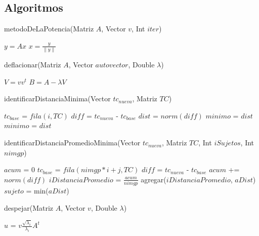 \subsection{Algoritmos}

\begin{algorithm}
\caption{metodoDeLaPotencia(Matriz $A$, Vector $v$, Int $iter$)}
\label{pseudo:metodoDeLaPotencia}
\begin{algorithmic}
    \STATE $y = Ax$
    \STATE $x = \frac{y}{\parallel y \parallel}$
  \ENDFOR
\end{algorithmic}
\end{algorithm}
\begin{algorithm}
\caption{deflacionar(Matriz $A$, Vector $autovector$, Double $\lambda$)}
\label{pseudo:deflacionar}
\begin{algorithmic}
  \STATE $V = vv^t$
  \STATE $B = A - \lambda V$
\end{algorithmic}
\end{algorithm}
\begin{algorithm}
\caption{identificarDistanciaMinima(Vector $tc_{nueva}$, Matriz $TC$)}
\label{pseudo:identificarDistanciMinima}
\begin{algorithmic}
    \STATE $tc_{base}$ = $fila(i, TC)$
    \STATE $diff$ = $tc_{nueva}$ - $tc_{base}$
    \STATE $dist$ = $norm(diff)$
      \STATE $minimo$ = $dist$
    \ENDIF
      \STATE $minimo$ = $dist$
    \ENDIF    
  \ENDFOR
\end{algorithmic}
\end{algorithm}
\begin{algorithm}
\caption{identificarDistanciaPromedioMinima(Vector $tc_{nueva}$, Matriz $TC$, Int $iSujetos$, Int $nimgp$)}
\label{pseudo:identificarDistanciaPromedioMinima}
\begin{algorithmic}
    \STATE $acum$ = $0$
      \STATE $tc_{base}$ = $fila(nimgp*i+j, TC)$
      \STATE $diff$ = $tc_{nueva}$ - $tc_{base}$
      \STATE $acum$ += $norm(diff)$      
    \ENDFOR
    \STATE $iDistanciaPromedio$ = $\frac{acum}{nimgp}$
    \STATE agregar($iDistanciaPromedio$, $aDist$)
  \ENDFOR
  \STATE $sujeto$ = min($aDist$)
\end{algorithmic}
\end{algorithm}
\begin{algorithm}
\caption{despejar(Matriz $A$, Vector $v$, Double $\lambda$)}
\label{pseudo:despejar}
\begin{algorithmic}
  \STATE $u$ = $v\frac{ \sqrt{\lambda_{i} } }{ \lambda_{i} }  A^{t}$   
\end{algorithmic}
\end{algorithm}